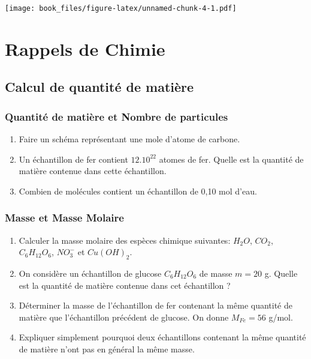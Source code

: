 \documentclass[
]{book}
\providecommand{\tightlist}{%
  \setlength{\itemsep}{0pt}\setlength{\parskip}{0pt}}
\def\tightlist{}
\begin{document}
\texttt{[image: book\_files/figure-latex/unnamed-chunk-4-1.pdf]}

\hypertarget{rappels-de-chimie}{%
\chapter*{Rappels de Chimie}\label{rappels-de-chimie}}

\hypertarget{calcul-de-quantituxe9-de-matiuxe8re}{%
\section{Calcul de quantité de matière}\label{calcul-de-quantituxe9-de-matiuxe8re}}

\hypertarget{quantituxe9-de-matiuxe8re-et-nombre-de-particules}{%
\subsection{Quantité de matière et Nombre de particules}\label{quantituxe9-de-matiuxe8re-et-nombre-de-particules}}

\begin{enumerate}
\def\labelenumi{\arabic{enumi}.}
\tightlist
\item
  Faire un schéma représentant une mole d'atome de carbone.
\item
  Un échantillon de fer contient \(12.10^{22}\) atomes de fer. Quelle est la quantité de matière contenue dans cette échantillon.
\item
  Combien de molécules contient un échantillon de 0,10 mol d'eau.
\end{enumerate}

\hypertarget{masse-et-masse-molaire}{%
\subsection{Masse et Masse Molaire}\label{masse-et-masse-molaire}}

\begin{enumerate}
\def\labelenumi{\arabic{enumi}.}
\tightlist
\item
  Calculer la masse molaire des espèces chimique suivantes: \(H_2O\), \(CO_2\), \(C_6H_{12}O_6\), \(NO_3^{-}\) et \(Cu(OH)_2\).
\item
  On considère un échantillon de glucose \(C_6H_{12}O_6\) de masse \(m=20\) g. Quelle est la quantité de matière contenue dans cet échantillon ?
\item
  Déterminer la masse de l'échantillon de fer contenant la même quantité de matière que l'échantillon précédent de glucose. On donne \(M_{Fe}=56\) g/mol.
\item
  Expliquer simplement pourquoi deux échantillons contenant la même quantité de matière n'ont pas en général la même masse.
\end{enumerate}
\end{document}
